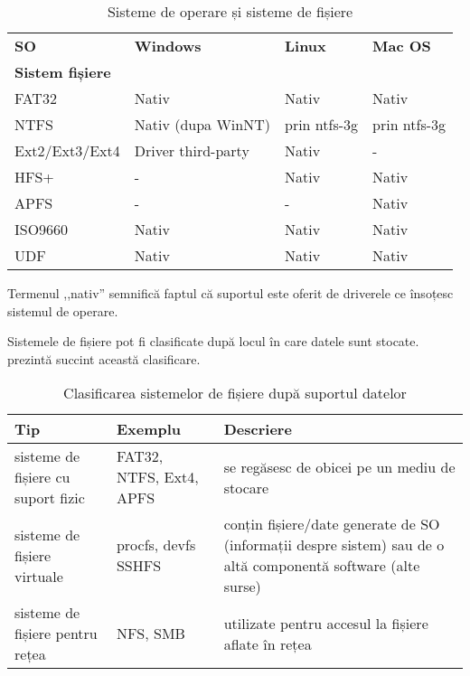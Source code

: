 \begin{table}[htb]
\caption{Sisteme de operare și sisteme de fișiere}
\begin{center}
	\begin{tabular}{ p{} p{} p{} p{} }
	\toprule
		\textbf{SO} & \textbf{Windows} & \textbf{Linux} & \textbf{Mac OS} \\
		\textbf{Sistem fișiere} & & & \\
	\midrule
		FAT32 & Nativ & Nativ & Nativ \\
	\midrule
		NTFS & Nativ (dupa WinNT) & prin ntfs-3g & prin ntfs-3g \\
	\midrule
		Ext2/Ext3/Ext4 & Driver third-party & Nativ & - \\
	\midrule
		HFS+ & - & Nativ & Nativ \\
        \midrule
                APFS & - & - & Nativ \\
	\midrule
		ISO9660 & Nativ & Nativ & Nativ \\
	\midrule
		UDF & Nativ & Nativ & Nativ \\
	\bottomrule
	\end{tabular}
	\label{table:file-system-backup-fs-types}
\end{center}
\end{table}

Termenul ,,nativ'' semnifică faptul că suportul este oferit de driverele ce
însoțesc sistemul de operare.

Sistemele de fișiere pot fi clasificate după locul în care datele sunt stocate.
 prezintă succint
această clasificare.

\begin{table}[htb]
\caption{Clasificarea sistemelor de fișiere după suportul datelor}
\begin{center}
	\begin{tabular}{ p{} p{} p{} }
	\toprule
		\textbf{Tip} & \textbf{Exemplu} & \textbf{Descriere} \\
	\midrule
		sisteme de fișiere cu suport fizic & 	FAT32, NTFS, Ext4, APFS & se
		regăsesc de obicei pe un mediu de stocare \\
	\midrule
		sisteme de fișiere virtuale & procfs, devfs SSHFS & conțin fișiere/date generate
		de SO (informații despre sistem) sau de o altă componentă software (alte surse) \\
	\midrule
		sisteme de fișiere pentru rețea & NFS, SMB & utilizate pentru accesul la
		fișiere aflate în rețea \\
	\bottomrule
	\end{tabular}
	\label{table:file-system-fs-classes}
\end{center}
\end{table}

